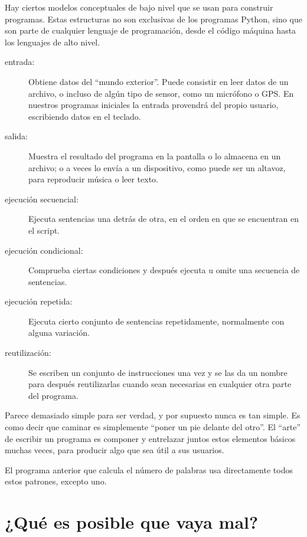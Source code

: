 Hay ciertos modelos conceptuales de bajo nivel que se usan para construir programas.
Estas estructuras no son exclusivas de los programas Python, sino que son parte de
cualquier lenguaje de programación, desde el código máquina hasta los lenguajes de alto
nivel.

\begin{description}

\item[entrada:] Obtiene datos del ``mundo exterior''. Puede consistir en
leer datos de un archivo, o incluso de algún tipo de sensor, como un micrófono
o GPS. En nuestros programas iniciales la entrada provendrá del propio usuario,
escribiendo datos en el teclado.

\item[salida:] Muestra el resultado del programa en la pantalla
o lo almacena en un archivo; o a veces lo envía a un dispositivo, como puede ser
un altavoz, para reproducir música o leer texto.

\item[ejecución secuencial:] Ejecuta sentencias una detrás de otra,
en el orden en que se encuentran en el script.

\item[ejecución condicional:] Comprueba ciertas condiciones y
después ejecuta u omite una secuencia de sentencias.

\item[ejecución repetida:] Ejecuta cierto conjunto de sentencias
repetidamente, normalmente con alguna variación.

\item[reutilización:] Se escriben un conjunto de instrucciones una vez y se las da un nombre
para después reutilizarlas cuando sean necesarias en cualquier otra parte
del programa.

\end{description}

Parece demasiado simple para ser verdad, y por supuesto nunca es tan simple.
Es como decir que caminar es simplemente
``poner un pie delante del otro''. El ``arte''
de escribir un programa es componer y entrelazar juntos estos
elementos básicos muchas veces, para producir algo
que sea útil a sus usuarios.

El programa anterior que calcula el número de palabras usa directamente
todos estos patrones, excepto uno.

\section{¿Qué es posible que vaya mal?}

